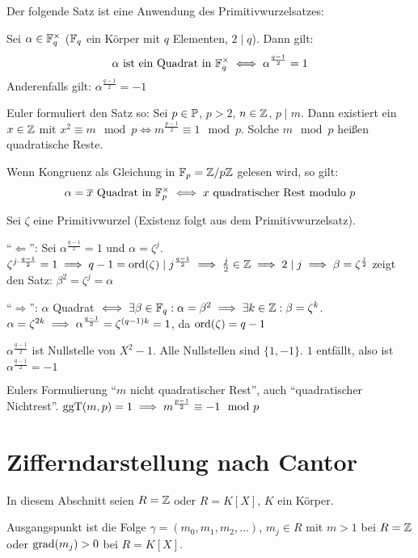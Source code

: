 \documentclass[a4paper,twoside,DIV15,BCOR12mm]{scrbook}
\begin{document}
Der folgende Satz ist eine Anwendung des Primitivwurzelsatzes:

\begin{satz}
Sei $\alpha\in\mathbb{F}_q^\times$ ($\mathbb{F}_q$ ein Körper mit $q$ Elementen,
$2\mid q$). Dann gilt:
\[ \alpha \text{ ist ein Quadrat in }\mathbb{F}_q^\times \iff \alpha^{\frac{q-1}{2}} = 1 \]
Anderenfalls gilt: $\alpha^{\frac{q-1}{2}} = -1$

Euler formuliert den Satz so: Sei $p\in\mathbb{P}$, $p>2$, $n\in\mathbb{Z}$,
$p\mid m$. Dann existiert ein $x\in\mathbb{Z}$ mit $x^2 \equiv m \mod p
\iff m^{\frac{p-1}2} \equiv 1 \mod p$. Solche $m\mod p$ heißen
quadratische Reste.

Wenn Kongruenz als Gleichung in $\mathbb{F}_p = \mathbb{Z}/p\mathbb{Z}$ gelesen wird,
so gilt:
\[ \alpha = \overline x \text{ Quadrat in }\mathbb{F}_p^\times \iff x \text{ quadratischer Rest modulo }p \]
\end{satz}

\begin{beweis}
Sei $\zeta$ eine Primitivwurzel (Existenz folgt aus dem
Primitivwurzelsatz).

"`$\Longleftarrow$"': Sei $\alpha^{\frac{q-1}2} = 1$ und $\alpha  =
\zeta ^j$. $\zeta^{j\cdot\frac{q-1}2} = 1 \implies q-1=\mathop{\rm ord}\nolimits(\zeta)\mid
j^{\frac{q-1}2} \implies \frac j 2 \in \mathbb{Z} \implies 2 \mid j \implies
\beta = \zeta^{\frac j 2}$ zeigt den Satz: $\beta^2 = \zeta ^j =
\alpha$

"`$\Longrightarrow$"': $\alpha$ Quadrat $\iff \exists \beta
\in\mathbb{F}_q: \alpha = \beta^2 \implies \exists k\in\mathbb{Z}: \beta =
\zeta^k$. $\alpha= \zeta^{2k} \implies \alpha ^{\frac{q-1}2} = \zeta
^{(q-1)k} = 1$, da $\mathop{\rm ord}\nolimits(\zeta) = q-1$

$\alpha^{\frac {q-1}2}$ ist Nullstelle von $X^2-1$. Alle Nullstellen
sind $\{1,-1\}$. $1$ entfällt, also ist $\alpha^{\frac{q-1}2} = -1$
\end{beweis}

Eulers Formulierung "`$m$ nicht quadratischer Rest"', auch
"`quadratischer Nichtrest"'. $\mathop{\rm ggT}\nolimits(m,p) = 1 \implies m^{\frac{p-1}2}
\equiv -1 \mod p$

\section{Zifferndarstellung nach Cantor}

In diesem Abschnitt seien $R=\mathbb{Z}$ oder $R=K[X]$, $K$ ein Körper.

Ausgangspunkt ist die Folge $\gamma=(m_0,m_1,m_2,\ldots)$, $m_j\in
R$ mit $m>1$ bei $R=\mathbb{Z}$ oder $\mathop{\rm grad}\nolimits(m_j)>0$ bei $R=K[X]$.
\end{document}
